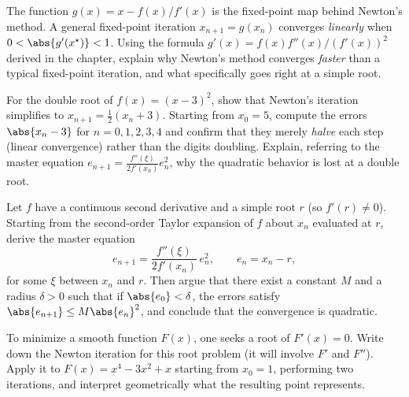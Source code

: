 \begin{exercise}[Conceptual]
The function $g(x) = x - f(x)/f'(x)$ is the fixed-point map behind Newton's method. A
general fixed-point iteration $x_{n+1} = g(x_n)$ converges \emph{linearly} when
$0 < \abs{g'(x^\star)} < 1$. Using the formula $g'(x) = f(x)f''(x)/(f'(x))^2$ derived
in the chapter, explain why Newton's method converges \emph{faster} than a typical
fixed-point iteration, and what specifically goes right at a simple root.
\end{exercise}

\begin{exercise}
For the double root of $f(x) = (x - 3)^2$, show that Newton's iteration simplifies to
$x_{n+1} = \tfrac12(x_n + 3)$. Starting from $x_0 = 5$, compute the errors
$\abs{x_n - 3}$ for $n = 0,1,2,3,4$ and confirm that they merely \emph{halve} each
step (linear convergence) rather than the digits doubling. Explain, referring to the
master equation $e_{n+1} = \tfrac{f''(\xi)}{2f'(x_n)} e_n^2$, why the quadratic
behavior is lost at a double root.
\end{exercise}

\begin{exercise}[Proof]
Let $f$ have a continuous second derivative and a simple root $r$ (so $f'(r) \ne 0$).
Starting from the second-order Taylor expansion of $f$ about $x_n$ evaluated at $r$,
derive the master equation
\[
  e_{n+1} = \frac{f''(\xi)}{2 f'(x_n)}\, e_n^2, \qquad e_n = x_n - r,
\]
for some $\xi$ between $x_n$ and $r$. Then argue that there exist a constant $M$ and a
radius $\delta > 0$ such that if $\abs{e_0} < \delta$, the errors satisfy
$\abs{e_{n+1}} \le M \abs{e_n}^2$, and conclude that the convergence is quadratic.
\end{exercise}

\begin{exercise}[Application]
To minimize a smooth function $F(x)$, one seeks a root of $F'(x) = 0$. Write down the
Newton iteration for this root problem (it will involve $F'$ and $F''$). Apply it to
$F(x) = x^4 - 3x^2 + x$ starting from $x_0 = 1$, performing two iterations, and
interpret geometrically what the resulting point represents.
\end{exercise}
